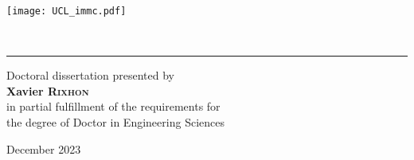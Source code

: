 \begin{titlingpage}

\begin{flushleft}
\texttt{[image: UCL\_immc.pdf]}
\end{flushleft}


\vspace{2 cm}


\begin{flushright}
\vspace{0.2cm}
{\fontsize{16}{20}\selectfont \mytitle\\[1em]
{\fontsize{14}{16}\selectfont \mysubtitle}}
\end{flushright}

\begin{flushright}
\rule{0.75\linewidth}{0.2mm}
\end{flushright}

\begin{flushright}
\vspace{1 cm}
\begin{small}
Doctoral dissertation presented by\\
\vspace{0.1cm}
{\Large \textbf{Xavier \textsc{Rixhon}}}\\
\vspace{0.1cm}
in partial fulfillment of the requirements for\\
the degree of Doctor in Engineering Sciences\\[1em]%
\end{small}
\end{flushright}

\begin{flushright}
\begin{small}
December 2023\\%
\end{small}
\end{flushright}



\end{titlingpage}
